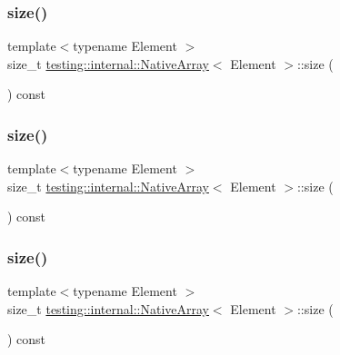 \subsubsection{\texorpdfstring{size()}{size()}\hspace{0.1cm}{\footnotesize\ttfamily [1/3]}}
{\footnotesize\ttfamily template$<$typename Element $>$ \\
size\+\_\+t \mbox{\hyperlink{classtesting_1_1internal_1_1_native_array}{testing\+::internal\+::\+Native\+Array}}$<$ Element $>$\+::size (\begin{DoxyParamCaption}{ }\end{DoxyParamCaption}) const\hspace{0.3cm}{\ttfamily [inline]}}

\mbox{\label{classtesting_1_1internal_1_1_native_array_af96a4a5ca0cdd5d163c47a081f08bd89}} 
\subsubsection{\texorpdfstring{size()}{size()}\hspace{0.1cm}{\footnotesize\ttfamily [2/3]}}
{\footnotesize\ttfamily template$<$typename Element $>$ \\
size\+\_\+t \mbox{\hyperlink{classtesting_1_1internal_1_1_native_array}{testing\+::internal\+::\+Native\+Array}}$<$ Element $>$\+::size (\begin{DoxyParamCaption}{ }\end{DoxyParamCaption}) const\hspace{0.3cm}{\ttfamily [inline]}}

\mbox{\label{classtesting_1_1internal_1_1_native_array_af96a4a5ca0cdd5d163c47a081f08bd89}} 
\subsubsection{\texorpdfstring{size()}{size()}\hspace{0.1cm}{\footnotesize\ttfamily [3/3]}}
{\footnotesize\ttfamily template$<$typename Element $>$ \\
size\+\_\+t \mbox{\hyperlink{classtesting_1_1internal_1_1_native_array}{testing\+::internal\+::\+Native\+Array}}$<$ Element $>$\+::size (\begin{DoxyParamCaption}{ }\end{DoxyParamCaption}) const\hspace{0.3cm}{\ttfamily [inline]}}



